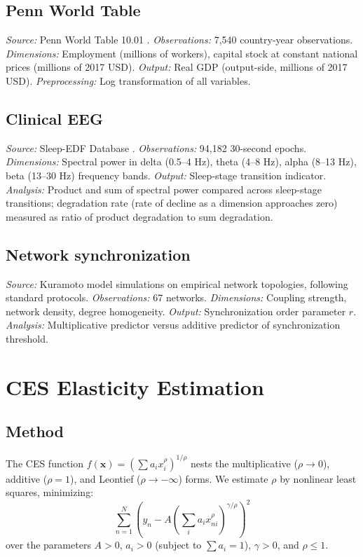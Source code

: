 \documentclass[12pt, a4paper]{article}
\theoremstyle{definition}
\theoremstyle{remark}
\begin{document}
\subsection{Penn World Table}

\textit{Source:} Penn World Table 10.01 \cite{feenstra2015}. \textit{Observations:} 7,540 country-year observations. \textit{Dimensions:} Employment (millions of workers), capital stock at constant national prices (millions of 2017 USD). \textit{Output:} Real GDP (output-side, millions of 2017 USD). \textit{Preprocessing:} Log transformation of all variables.

\subsection{Clinical EEG}

\textit{Source:} Sleep-EDF Database \cite{goldberger2000}. \textit{Observations:} 94,182 30-second epochs. \textit{Dimensions:} Spectral power in delta (0.5--4 Hz), theta (4--8 Hz), alpha (8--13 Hz), beta (13--30 Hz) frequency bands. \textit{Output:} Sleep-stage transition indicator. \textit{Analysis:} Product and sum of spectral power compared across sleep-stage transitions; degradation rate (rate of decline as a dimension approaches zero) measured as ratio of product degradation to sum degradation.

\subsection{Network synchronization}

\textit{Source:} Kuramoto model simulations on empirical network topologies, following standard protocols. \textit{Observations:} 67 networks. \textit{Dimensions:} Coupling strength, network density, degree homogeneity. \textit{Output:} Synchronization order parameter $r$. \textit{Analysis:} Multiplicative predictor versus additive predictor of synchronization threshold.


\section{CES Elasticity Estimation}\label{app:ces}

\subsection{Method}

The CES function $f(\mathbf{x}) = \left(\sum a_i x_i^\rho\right)^{1/\rho}$ nests the multiplicative ($\rho \to 0$), additive ($\rho = 1$), and Leontief ($\rho \to -\infty$) forms. We estimate $\rho$ by nonlinear least squares, minimizing:
\[
\sum_{n=1}^{N} \left(y_n - A\left(\sum_{i} a_i x_{ni}^\rho\right)^{\gamma/\rho}\right)^2
\]
over the parameters $A > 0$, $a_i > 0$ (subject to $\sum a_i = 1$), $\gamma > 0$, and $\rho \leq 1$.
\end{document}
